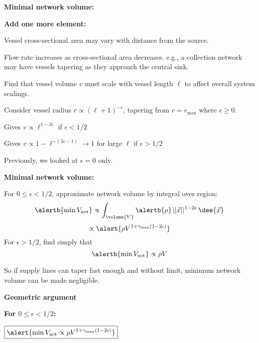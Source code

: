   \textbf{Minimal network volume:}

  \textbf{Add one more element:}
    
     Vessel cross-sectional area
      may vary with distance from the source.
    
      Flow rate increases as cross-sectional area decreases.
     e.g., a collection network may
      have vessels tapering as they approach
      the central sink.
    
      Find that vessel volume $v$ must scale
      with vessel length $\ell$ to affect overall
      system scalings.
    
      Consider vessel radius $r \propto (\ell+1)^{-\epsilon}$,
      tapering from $r=r_{\max}$ where $\epsilon \ge 0$.
    
      Gives
      $
      v \propto \ell^{1-2\epsilon}
      $ if $\epsilon < 1/2$
    
      Gives
      $
      v \propto 1 - \ell^{-(2\epsilon-1)} \rightarrow 1$ for large $\ell$
      if $\epsilon > 1/2$
    
      Previously, we looked at $\epsilon=0$ only.
    
  

  \textbf{Minimal network volume:}

  For $0 \le \epsilon < 1/2$, approximate network volume by integral over region:
  $$ 
  \alertb{\min V_{\textnormal{net}}}  \propto 
  \int_{\volume{V}} \alertb{\rho} \, ||\vec{x}||^{1-2\epsilon} \, \dee{\vec{x}} 
  $$
  {}
  {
    $$
    \propto
    \alert{ \rho V^{1+\gamma_{\max}(1-2\epsilon)} } 
    $$
  }
  {
    For $\epsilon > 1/2$, find simply that 
    $$
    \alertb{\min V_{\textnormal{net}}}  
    \propto 
    \rho V
    $$
  }
  
  
    So if supply lines can taper fast enough and without
    limit, minimum network volume can be made negligible.
%  
  

  \textbf{Geometric argument}

  \textbf{For $0 \le \epsilon < 1/2$:}
    
     
      $
      \boxed{\alert{
          \min V_{\textnormal{net}} 
          \propto
          \rho V^{1+\gamma_{\max}(1-2\epsilon)} 
        }}
      $
     
